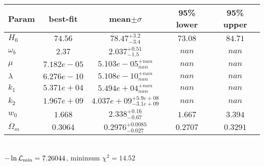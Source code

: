 \begin{tabular}{|l|c|c|c|c|} 
 \hline 
Param & best-fit & mean$\pm\sigma$ & 95\% lower & 95\% upper \\ \hline 
$H_{0 }$ &$74.56$ & $78.47_{-3.4}^{+3.2}$ & $73.08$ & $84.71$ \\ 
$\omega_b$ &$2.37$ & $2.037_{-1.5}^{+0.51}$ & $nan$ & $nan$ \\ 
$\mu$ &$7.182e-05$ & $5.103e-05_{nan}^{+nan}$ & $nan$ & $nan$ \\ 
$\lambda$ &$6.276e-10$ & $5.108e-10_{nan}^{+nan}$ & $nan$ & $nan$ \\ 
$k_{1 }$ &$5.371e+04$ & $5.494e+04_{nan}^{+nan}$ & $nan$ & $nan$ \\ 
$k_{2 }$ &$1.967e+09$ & $4.037e+09_{-3.1e+09}^{+5.9e+08}$ & $nan$ & $nan$ \\ 
$w_{0 }$ &$1.668$ & $2.338_{-0.67}^{+0.16}$ & $1.667$ & $3.394$ \\ 
$\Omega_{m }$ &$0.3064$ & $0.2976_{-0.027}^{+0.0085}$ & $0.2707$ & $0.3291$ \\ 
\hline 
 \end{tabular} \\ 
$-\ln{\cal L}_\mathrm{min} =7.26044$, minimum $\chi^2=14.52$ \\ 
